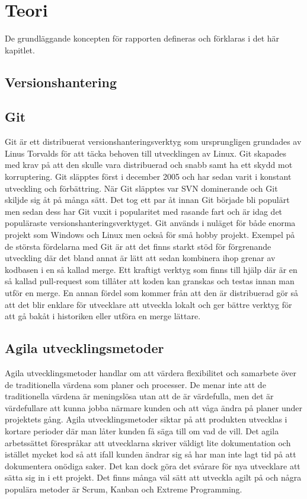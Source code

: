 \section{Teori}
\label{sec:bjorn-theory}
De grundläggande koncepten för rapporten defineras och förklaras i det här kapitlet.

\subsection{Versionshantering}

\subsection{Git}
Git är ett distribuerat versionshanteringsverktyg som ursprungligen grundades av Linus Torvalds för att täcka behoven till utvecklingen av Linux. Git skapades med krav på att den skulle vara distribuerad och snabb samt ha ett skydd mot korruptering. Git släpptes först i december 2005 och har sedan varit i konstant utveckling och förbättring. När Git släpptes var SVN dominerande och Git skiljde sig åt på många sätt. Det tog ett par åt innan Git började bli populärt men sedan dess har Git vuxit i popularitet med rasande fart och är idag det populäraste versionshanteringsverktyget. Git används i nuläget för både enorma projekt som Windows och Linux men också för små hobby projekt.
Exempel på de största fördelarna med Git är att det finns starkt stöd för förgrenande utveckling där det bland annat är lätt att sedan kombinera ihop grenar av kodbasen i en så kallad merge. Ett kraftigt verktyg som finns till hjälp där är en så kallad pull-request som tillåter att koden kan granskas och testas innan man utför en merge. En annan fördel som kommer från att den är distribuerad gör så att det blir enklare för utvecklare att utveckla lokalt och ger bättre verktyg för att gå bakåt i historiken eller utföra en merge lättare.

\subsection{Agila utvecklingsmetoder}
Agila utvecklingsmetoder handlar om att värdera flexibilitet och samarbete över de traditionella värdena som planer och processer. De menar inte att de traditionella värdena är meningslösa utan att de är värdefulla, men det är värdefullare att kunna jobba närmare kunden och att våga ändra på planer under projektets gång. Agila utvecklingsmetoder siktar på att produkten utvecklas i kortare perioder där man låter kunden få säga till om vad de vill. Det agila arbetssättet förespråkar att utvecklarna skriver väldigt lite dokumentation och istället mycket kod så att ifall kunden ändrar sig så har man inte lagt tid på att dokumentera onödiga saker. Det kan dock göra det svårare för nya utvecklare att sätta sig in i ett projekt.
Det finns många väl sätt att utveckla agilt på och några populära metoder är Scrum, Kanban och Extreme Programming.